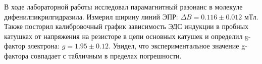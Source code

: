 \documentclass[11pt]{article}
\begin{document}
В ходе лабораторной работы исследовал парамагнитный разонанс в молекуле
дифенилпикрилгидразила. Измерил ширину линий ЭПР:
\(\Delta B = 0.116 \pm 0.012 \text{ мТл.}\) Также посторил калибровочный
график зависимость ЭДС индукции в пробных катушках от напряжения на
резисторе в цепи основных катушек и определил g-фактор электрона:
\(g = 1.95 \pm 0.12\). Увидел, что экспериментальное значение g-фактора
совпадает с табличным в пределах погрешности.


    
    
    
\end{document}
